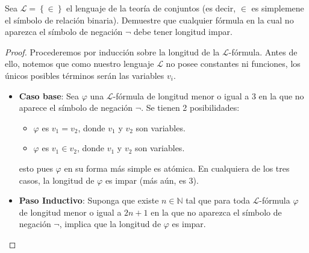 \documentclass[12pt]{article}
\newcounter{it}
\theoremstyle{largebreak}
\begin{document}
    \begin{excer}
        Sea $\mathcal{L}=\left\{\in\right\}$ el lenguaje de la teoría de conjuntos (es decir, $\in$ es simplemene el símbolo de relación binaria). Demuestre que cualquier fórmula en la cual no aparezca el símbolo de negación $\neg$ debe tener longitud impar.
    \end{excer}

    \begin{proof}
        Procederemos por inducción sobre la longitud de la $\mathcal{L}$-fórmula. Antes de ello, notemos que como nuestro lenguaje $\mathcal{L}$ no posee constantes ni funciones, los únicos posibles términos serán las variables $v_i$. 
        \begin{itemize}
            \item \textbf{Caso base}: Sea $\varphi$ una $\mathcal{L}$-fórmula de longitud menor o igual a 3 en la que no aparece el símbolo de negación $\neg$. Se tienen 2 posibilidades:
            \begin{itemize}
                \item $\varphi$ es $v_1=v_2$, donde $v_1$ y $v_2$ son variables.
                \item $\varphi$ es $v_1\in v_2$, donde $v_1$ y $v_2$ son variables. 
            \end{itemize}
            esto pues $\varphi$ en su forma más simple es atómica. En cualquiera de los tres casos, la longitud de $\varphi$ es impar (más aún, es 3).
            \item \textbf{Paso Inductivo}: Suponga que existe $n\in\mathbb{N}$ tal que para toda $\mathcal{L}$-fórmula $\varphi$ de longitud menor o igual a $2n+1$ en la que no aparezca el símbolo de negación $\neg$, implica que la longitud de $\varphi$ es impar.
            

\end{itemize}
\end{proof}
\end{document}
